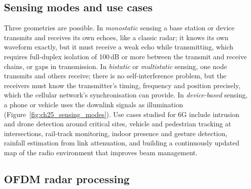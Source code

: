 
\subsection{Sensing modes and use cases}

Three geometries are possible. In \emph{monostatic} sensing a base station or device transmits and
receives its own echoes, like a classic radar; it knows its own waveform exactly, but it must receive
a weak echo while transmitting, which requires full-duplex isolation of 100\,dB or more between the
transmit and receive chains, or gaps in transmission. In \emph{bistatic} or \emph{multistatic}
sensing, one node transmits and others receive; there is no self-interference problem, but the
receivers must know the transmitter's timing, frequency and position precisely, which the cellular
network's synchronisation can provide. In \emph{device-based} sensing, a phone or vehicle uses the
downlink signals as illumination (Figure~\ref{fig:ch25_sensing_modes}). Use cases studied for 6G include intrusion and drone detection
around critical sites, vehicle and pedestrian tracking at intersections, rail-track monitoring,
indoor presence and gesture detection, rainfall estimation from link attenuation, and building a
continuously updated map of the radio environment that improves beam management.


\subsection{OFDM radar processing}

